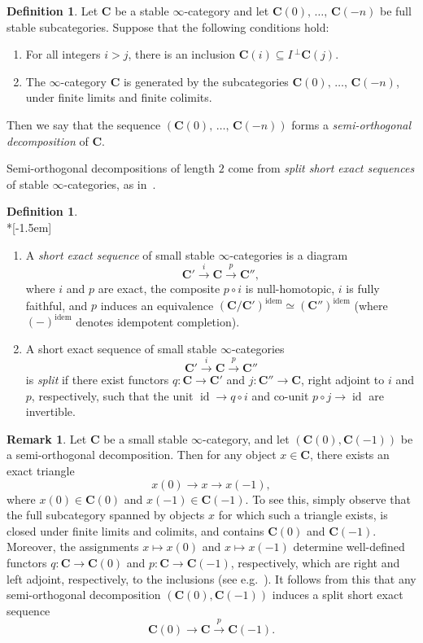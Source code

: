 \documentclass[11pt]{article}
\theoremstyle{definition}
\newtheorem{defi}[theo]{Definition}
\newtheorem{rema}[theo]{Remark}
\numberwithin{equation}{section}
\numberwithin{figure}{section}
\numberwithin{table}{section}
\newcommand{\bC}{\ensuremath{\mathbf{C}}\xspace}
\newcommand{\idem}{{\mrm{idem}}}
\DeclareMathOperator{\id}{id}
\newcommand{\mrm}[1]{\ensuremath{\mathrm{#1}}\xspace}
\newcommand*{\romanenumi}{\renewcommand*{\theenumi}{\roman{enumi}}}
\begin{document}
\begin{defi}\label{defn:SOD}
Let $\bC$ be a stable $\infty$-category and let $\bC(0),\,\ldots,\,\bC(-n)$ be full stable subcategories. Suppose that the following conditions hold:
\begin{enumerate}\romanenumi
\item For all integers $i>j$, there is an inclusion $\bC(i) \subseteq I\,^\perp\bC(j)$.
\item The $\infty$-category $\bC$ is generated by the subcategories $\bC(0),\,\ldots,\,\bC(-n)$, under finite limits and finite colimits.
\end{enumerate}
Then we say that the sequence $(\bC(0),\,\ldots,\,\bC(-n))$ forms a \emph{semi-orthogonal decomposition} of $\bC$.
\end{defi}

Semi-orthogonal decompositions of length $2$ come from \emph{split short exact sequences} of stable $\infty$-categories, as in~\cite{BlumbergGepnerTabuada}.

\begin{defi} \ \\*[-1.5em]%
\begin{enumerate}\romanenumi
\item A \emph{short exact sequence} of small stable $\infty$-categories is a diagram
\[
\bC' \xrightarrow{i} \bC \xrightarrow{p} \bC'',
\]
where $i$ and $p$ are exact, the composite $p\circ i$ is null-homotopic, $i$ is fully faithful, and $p$ induces an equivalence $(\bC/\bC')^\idem \simeq (\bC'')^\idem$ (where $(-)^\idem$ denotes idempotent completion).
\item A short exact sequence of small stable $\infty$-categories
\[
\bC' \xrightarrow{i} \bC \xrightarrow{p} \bC''
\]
is \emph{split} if there exist functors $q : \bC \to \bC'$ and $j : \bC'' \to \bC$, right adjoint to $i$ and $p$, respectively, such that the unit $\id \to q\circ i$ and co-unit $p\circ j \to \id$ are invertible.
\end{enumerate}
\end{defi}

\begin{rema}\label{rem:SOD to split SES}
Let $\bC$ be a small stable $\infty$-category, and let $(\bC(0), \bC(-1))$ be a semi-orthogonal decomposition. Then for any object $x \in \bC$, there exists an exact triangle
\[
x(0) \to x \to x(-1),
\]
where $x(0) \in \bC(0)$ and $x(-1) \in \bC(-1)$. To see this, simply observe that the full subcategory spanned by objects $x$ for which such a triangle exists, is closed under finite limits and colimits, and contains $\bC(0)$ and $\bC(-1)$. Moreover, the assignments $x \mapsto x(0)$ and $x \mapsto x(-1)$ determine well-defined functors $q : \bC \to \bC(0)$ and $p : \bC \to \bC(-1)$, respectively, which are right and left adjoint, respectively, to the inclusions (see e.g.~\cite[Remark~7.2.0.2]{SAG-20180204}). It follows from this that any semi-orthogonal decomposition $(\bC(0),\bC(-1))$ induces a split short exact sequence
\[
\bC(0) \to \bC \xrightarrow{p} \bC(-1).
\]
\end{rema}
\end{document}
